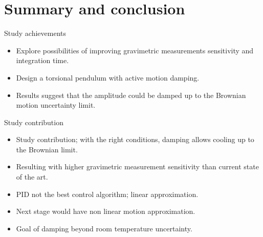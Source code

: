 \documentclass{beamer}
\begin{document}
\section{Summary and conclusion}
\begin{frame}{Study achievements}
	\begin{itemize}
		
		
		\item Explore possibilities of improving gravimetric measurements sensitivity and integration time. 
		\item Design a torsional pendulum with active motion damping. 
		\pause
		\item Results suggest that the amplitude could be damped up to the Brownian motion uncertainty limit. 
		
		
	\end{itemize}
\end{frame}

\begin{frame}{Study contribution}
	\begin{itemize}
		
		\item Study contribution; with the right conditions, damping allows cooling up to the Brownian limit. 
		\item Resulting with higher gravimetric measurement sensitivity than current state of the art.
		\pause
		\item PID not the best control algorithm; linear approximation. 
		\item Next stage would have non linear motion approximation.
		\item Goal of damping beyond room temperature uncertainty. 
	\end{itemize}
\end{frame}
\end{document}
